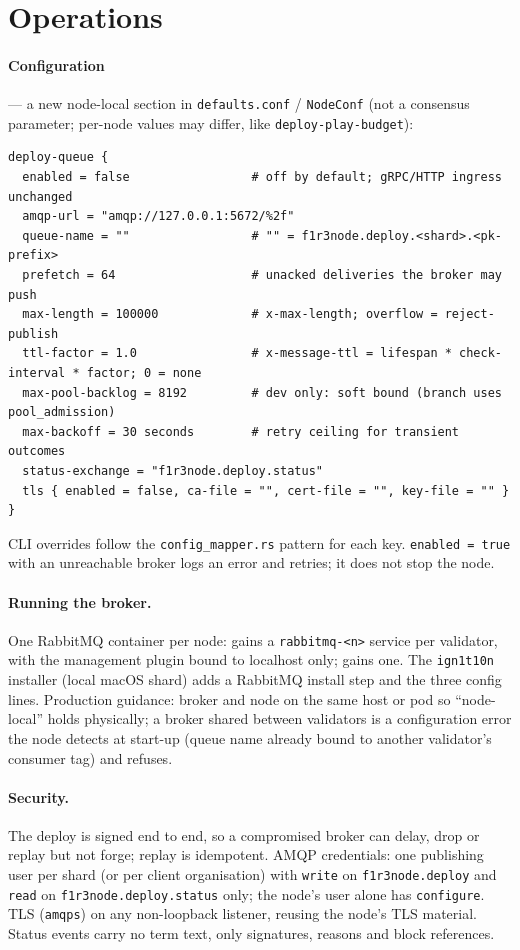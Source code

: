 \documentclass[11pt]{article}
\newcommand{\code}[1]{\texttt{#1}}
\begin{document}
\section{Operations}

\paragraph{Configuration} --- a new node-local section in \code{defaults.conf} /
\code{NodeConf} (not a consensus parameter; per-node values may differ, like
\code{deploy-play-budget}):
\begin{lstlisting}
deploy-queue {
  enabled = false                 # off by default; gRPC/HTTP ingress unchanged
  amqp-url = "amqp://127.0.0.1:5672/%2f"
  queue-name = ""                 # "" = f1r3node.deploy.<shard>.<pk-prefix>
  prefetch = 64                   # unacked deliveries the broker may push
  max-length = 100000             # x-max-length; overflow = reject-publish
  ttl-factor = 1.0                # x-message-ttl = lifespan * check-interval * factor; 0 = none
  max-pool-backlog = 8192         # dev only: soft bound (branch uses pool_admission)
  max-backoff = 30 seconds        # retry ceiling for transient outcomes
  status-exchange = "f1r3node.deploy.status"
  tls { enabled = false, ca-file = "", cert-file = "", key-file = "" }
}
\end{lstlisting}
CLI overrides follow the \code{config\_mapper.rs} pattern for each key.
\code{enabled = true} with an unreachable broker logs an error and retries; it does
not stop the node.

\paragraph{Running the broker.} One RabbitMQ container per node:
 gains a \code{rabbitmq-<n>} service per validator, with the
management plugin bound to localhost only;  gains one.
The \code{ign1t10n} installer (local macOS shard) adds a RabbitMQ install step and the
three config lines. Production guidance: broker and node on the same host or pod so
``node-local'' holds physically; a broker shared between validators is a
configuration error the node detects at start-up (queue name already bound to another
validator's consumer tag) and refuses.

\paragraph{Security.} The deploy is signed end to end, so a compromised broker can
delay, drop or replay but not forge; replay is idempotent. AMQP credentials: one
publishing user per shard (or per client organisation) with \code{write} on
\code{f1r3node.deploy} and \code{read} on \code{f1r3node.deploy.status} only; the
node's user alone has \code{configure}. TLS (\code{amqps}) on any non-loopback
listener, reusing the node's TLS material. Status events carry no term text, only
signatures, reasons and block references.
\end{document}
